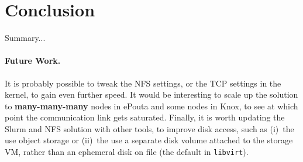 \section{Conclusion}
\label{section:conclusion}

Summary...
\vspace{1cm}

\paragraph{Future Work.}
%
It is probably possible to tweak the NFS settings, or the TCP settings
in the kernel, to gain even further speed.
%
It would be interesting to scale up the solution to
\textbf{many-many-many} nodes in ePouta and some nodes in Knox, to see
at which point the communication link gets saturated.
%
Finally, it is worth updating the Slurm and NFS solution with other
tools, to improve disk access, such as (i)~the use object storage or
(ii)~the use a separate disk volume attached to the storage VM, rather
than an ephemeral disk on file (\ie the default in \texttt{libvirt}).

